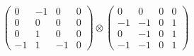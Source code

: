 \documentclass{article}
\begin{document}
{\begin{align}
            \begin{pmatrix} 0 & -1 & 0 & 0 \\ 0 & 0 & 0 & 0 \\ 0 & 1 & 0 & 0 \\ -1 & 1 & -1 & 0 \end{pmatrix} \otimes 
            \begin{pmatrix} 0 & 0 & 0 & 0 \\ -1 & -1 & 0 & 1 \\ 0 & -1 & 0 & 1 \\ -1 & -1 & 0 & 1 \end{pmatrix} 
        \end{align}
        }
        
        
        \begin{landscape}
        \resizebox{\columnwidth}{!}{
        \begin{tikzpicture}[node distance=3cm and 1cm, auto]
        

\end{tikzpicture}}
\end{landscape}
\end{document}
